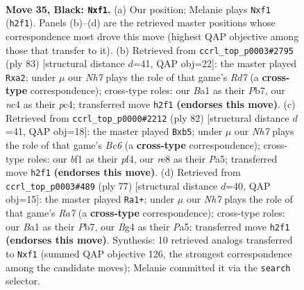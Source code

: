 \documentclass[11pt]{article}
\begin{document}
\clearpage

\begin{figure}[p]\centering
\begin{subfigure}{0.46\textwidth}\centering
\resizebox{\linewidth}{!}{%
\newchessgame
\chessboard[
  setfen={4R3/5pk1/p1p5/P3P1p1/1PN3b1/8/5K1n/b4B2 b - - 4 35},
  showmover=false,
  pgfstyle=straightmove, color=movearrow, markmove={h2-f1}
]}
\caption{}
\end{subfigure}\hfill
\begin{subfigure}{0.46\textwidth}\centering
\resizebox{\linewidth}{!}{%
\newchessgame
\chessboard[
  setfen={8/1p4k1/5pb1/2R5/2P3P1/p3N3/B2rPP2/6K1 b - - 0 42},
  showmover=false,
  pgfstyle=straightmove, color=movearrow, markmove={d2-a2}
]}
\caption{}
\end{subfigure}
\\[4pt]
\begin{subfigure}{0.46\textwidth}\centering
\resizebox{\linewidth}{!}{%
\newchessgame
\chessboard[
  setfen={2b5/7p/2B1n1p1/Pp2B3/5pkP/8/4KP2/8 w - - 2 42},
  showmover=false,
  pgfstyle=straightmove, color=movearrow, markmove={c6-b5}
]}
\caption{}
\end{subfigure}\hfill
\begin{subfigure}{0.46\textwidth}\centering
\resizebox{\linewidth}{!}{%
\newchessgame
\chessboard[
  setfen={8/1p3pk1/8/pP3b2/P2R1P2/8/r3B2P/4K3 b - - 1 39},
  showmover=false,
  pgfstyle=straightmove, color=movearrow, markmove={a2-a1}
]}
\caption{}
\end{subfigure}
\caption{\textbf{Move 35, Black: \texttt{Nxf1}.} (a) Our position; Melanie plays \texttt{Nxf1} (\texttt{h2f1}). Panels (b)--(d) are the retrieved master positions whose correspondence most drove this move (highest QAP objective among those that transfer to it). (b) Retrieved from \texttt{ccrl\_top\_p0003\#2795} (ply 83) [structural distance $d$=41, QAP obj=22]: the master played \texttt{Rxa2}; under $\mu$ our \emph{Nh7} plays the role of that game's \emph{Rd7} (a \textbf{cross-type} correspondence); cross-type roles: our \emph{B}a1 as their \emph{P}b7, our \emph{n}c4 as their \emph{p}c4; transferred move \texttt{h2f1} \textbf{(endorses this move)}. (c) Retrieved from \texttt{ccrl\_top\_p0000\#2212} (ply 82) [structural distance $d$=41, QAP obj=18]: the master played \texttt{Bxb5}; under $\mu$ our \emph{Nh7} plays the role of that game's \emph{Bc6} (a \textbf{cross-type} correspondence); cross-type roles: our \emph{b}f1 as their \emph{p}f4, our \emph{r}e8 as their \emph{P}a5; transferred move \texttt{h2f1} \textbf{(endorses this move)}. (d) Retrieved from \texttt{ccrl\_top\_p0003\#489} (ply 77) [structural distance $d$=40, QAP obj=15]: the master played \texttt{Ra1+}; under $\mu$ our \emph{Nh7} plays the role of that game's \emph{Ra7} (a \textbf{cross-type} correspondence); cross-type roles: our \emph{B}a1 as their \emph{P}b7, our \emph{B}g4 as their \emph{P}a5; transferred move \texttt{h2f1} \textbf{(endorses this move)}. Synthesis: 10 retrieved analogs transferred to \texttt{Nxf1} (summed QAP objective 126, the strongest correspondence among the candidate moves); Melanie committed it via the \texttt{search} selector.}
\label{fig:thought-m69}
\end{figure}
\end{document}
